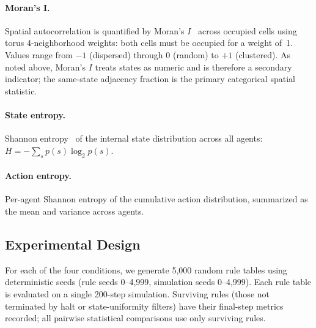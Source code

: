 \documentclass[letterpaper]{article}
\begin{document}
\paragraph{Moran's I.}
Spatial autocorrelation is quantified by Moran's $I$~\citep{moran1950notes}
across occupied cells using torus 4-neighborhood weights: both cells must be occupied for a
weight of~1.  Values range from $-1$ (dispersed) through $0$ (random) to $+1$
(clustered).  As noted above, Moran's $I$ treats states as numeric and is
therefore a secondary indicator; the same-state adjacency fraction is the
primary categorical spatial statistic.

\paragraph{State entropy.}
Shannon entropy~\citep{cover1991elements} of the internal state distribution
across all agents: $H = -\sum_s p(s) \log_2 p(s)$.

\paragraph{Action entropy.}
Per-agent Shannon entropy of the cumulative action distribution, summarized as
the mean and variance across agents.

\subsection{Experimental Design}

For each of the four conditions, we generate 5{,}000 random rule tables using
deterministic seeds (rule seeds 0--4{,}999, simulation seeds 0--4{,}999). Each
rule table is evaluated on a single 200-step simulation. Surviving rules (those
not terminated by halt or state-uniformity filters) have their final-step
metrics recorded; all pairwise statistical comparisons use only surviving rules.
\end{document}
